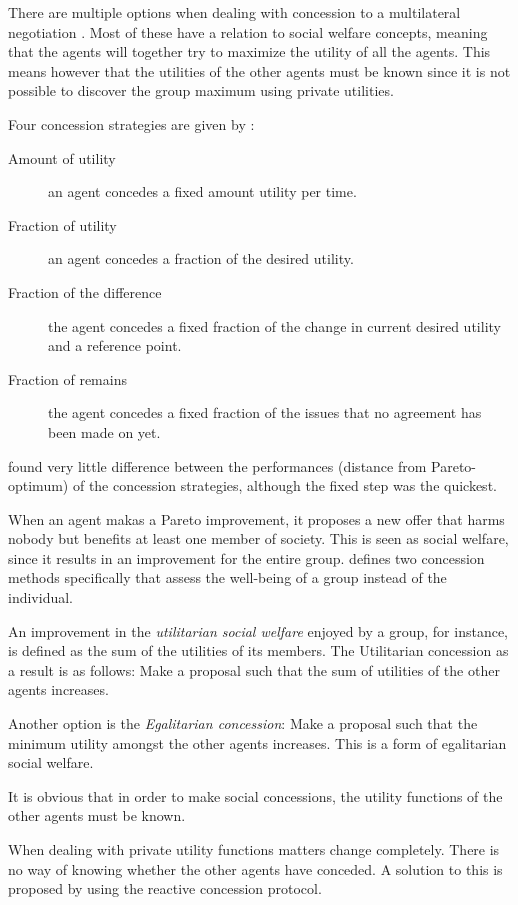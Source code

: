 There are multiple options when dealing with concession to a multilateral negotiation \citep{endriss2006monotonic}. Most of these have a relation to social welfare concepts, meaning that the agents will together try to maximize the utility of all the agents. This means however that the utilities of the other agents must be known since it is not possible to discover the group maximum using private utilities.

Four concession strategies are given by \citet{wu2009efficient}: 
\begin{description}
	\item[Amount of utility] an agent concedes a fixed amount utility per time. 
	\item[Fraction of utility] an agent concedes a fraction of the desired utility. 
	\item[Fraction of the difference] the agent concedes a fixed fraction of the change in current desired utility and a reference point. 
	\item[Fraction of remains] the agent concedes a fixed fraction of the issues that no agreement has been made on yet. \end{description} 
\citet{wu2009efficient} found very little difference between the performances (distance from Pareto-optimum) of the concession strategies, although the fixed step was the quickest. 

\begin{definition*}
	When an agent makas a Pareto improvement, it proposes a new offer that harms nobody but benefits at least one member of society. This is seen as social welfare, since it results in an improvement for the entire group. \citet{endriss2006monotonic} defines two concession methods specifically that assess the well-being of a group instead of the individual.
	
	An improvement in the \textit{utilitarian social welfare} enjoyed by a group, for instance, is defined as the sum of the utilities of its members.
The Utilitarian concession as a result is as follows: Make a proposal such that the sum of utilities of the other agents increases. 
	
	Another option is the \textit{Egalitarian concession}: Make a proposal such that the minimum utility amongst the other agents increases. This is a form of egalitarian social welfare.
	
	It is obvious that in order to make social concessions, the utility functions of the other agents must be known.

\end{definition*}
When dealing with private utility functions matters change completely. There is no way of knowing whether the other agents have conceded. A solution to this is proposed by \citet{zheng2015automated} using the reactive concession protocol.

